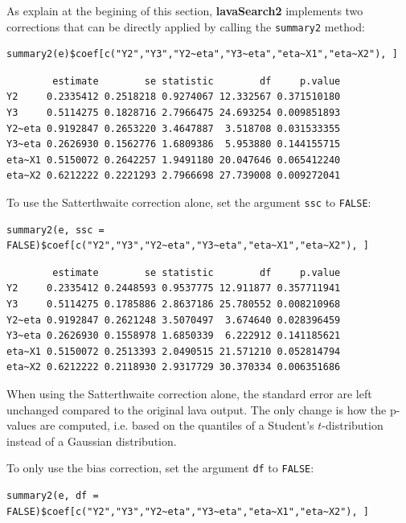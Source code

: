 \documentclass[12pt]{article}
\begin{document}
As explain at the begining of this section, \textbf{lavaSearch2} implements
two corrections that can be directly applied by calling the \texttt{summary2}
method:
\lstset{language=r,label= ,caption= ,captionpos=b,numbers=none}
\begin{lstlisting}
summary2(e)$coef[c("Y2","Y3","Y2~eta","Y3~eta","eta~X1","eta~X2"), ]
\end{lstlisting}

\begin{verbatim}
        estimate        se statistic        df     p.value
Y2     0.2335412 0.2518218 0.9274067 12.332567 0.371510180
Y3     0.5114275 0.1828716 2.7966475 24.693254 0.009851893
Y2~eta 0.9192847 0.2653220 3.4647887  3.518708 0.031533355
Y3~eta 0.2626930 0.1562776 1.6809386  5.953880 0.144155715
eta~X1 0.5150072 0.2642257 1.9491180 20.047646 0.065412240
eta~X2 0.6212222 0.2221293 2.7966698 27.739008 0.009272041
\end{verbatim}


To use the Satterthwaite correction alone, set the argument
  \texttt{ssc} to \texttt{FALSE}:

\lstset{language=r,label= ,caption= ,captionpos=b,numbers=none}
\begin{lstlisting}
summary2(e, ssc = FALSE)$coef[c("Y2","Y3","Y2~eta","Y3~eta","eta~X1","eta~X2"), ]
\end{lstlisting}

\begin{verbatim}
        estimate        se statistic        df     p.value
Y2     0.2335412 0.2448593 0.9537775 12.911877 0.357711941
Y3     0.5114275 0.1785886 2.8637186 25.780552 0.008210968
Y2~eta 0.9192847 0.2621248 3.5070497  3.674640 0.028396459
Y3~eta 0.2626930 0.1558978 1.6850339  6.222912 0.141185621
eta~X1 0.5150072 0.2513393 2.0490515 21.571210 0.052814794
eta~X2 0.6212222 0.2118930 2.9317729 30.370334 0.006351686
\end{verbatim}


When using the Satterthwaite correction alone, the standard error are
left unchanged compared to the original lava output. The only change
is how the p-values are computed, i.e. based on the quantiles of a
Student's \(t\)-distribution instead of a Gaussian distribution. 

To only use the bias correction, set the argument \texttt{df} to \texttt{FALSE}:
\lstset{language=r,label= ,caption= ,captionpos=b,numbers=none}
\begin{lstlisting}
summary2(e, df = FALSE)$coef[c("Y2","Y3","Y2~eta","Y3~eta","eta~X1","eta~X2"), ]
\end{lstlisting}
\end{document}

